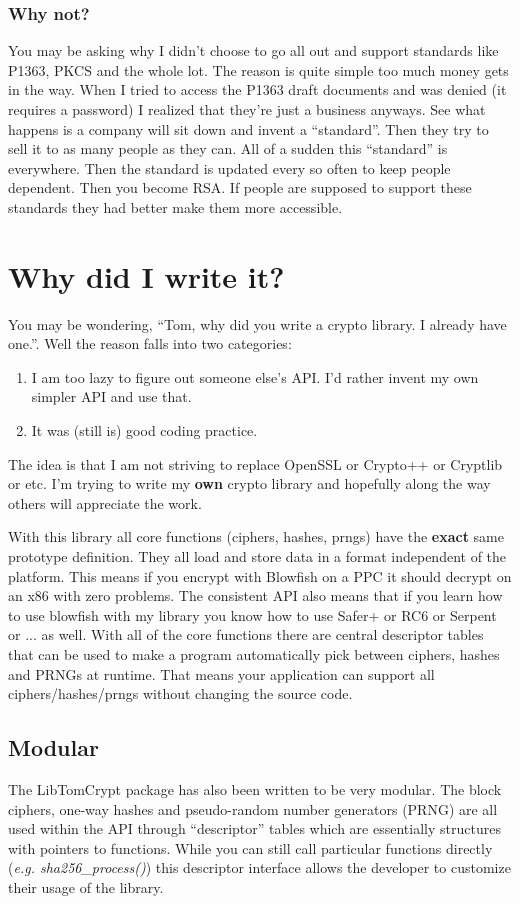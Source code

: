 \documentclass[b5paper]{book}
\begin{document}
\subsubsection{Why not?}
You may be asking why I didn't choose to go all out and support standards like P1363, PKCS and the whole lot.  The reason
is quite simple too much money gets in the way.  When I tried to access the P1363 draft documents and was denied (it 
requires a password) I realized that they're just a business anyways.  See what happens is a company will sit down and
invent a ``standard''.  Then they try to sell it to as many people as they can.  All of a sudden this ``standard'' is 
everywhere.  Then the standard is updated every so often to keep people dependent.  Then you become RSA.  If people are 
supposed to support these standards they had better make them more accessible.

\section{Why did I write it?}
You may be wondering, ``Tom, why did you write a crypto library.  I already have one.''.  Well the reason falls into
two categories:
\begin{enumerate}
    \item I am too lazy to figure out someone else's API.  I'd rather invent my own simpler API and use that.
    \item It was (still is) good coding practice.
\end{enumerate}

The idea is that I am not striving to replace OpenSSL or Crypto++ or Cryptlib or etc.  I'm trying to write my 
{\bf own} crypto library and hopefully along the way others will appreciate the work.

With this library all core functions (ciphers, hashes, prngs) have the {\bf exact} same prototype definition.  They all load
and store data in a format independent of the platform.  This means if you encrypt with Blowfish on a PPC it should decrypt
on an x86 with zero problems.  The consistent API also means that if you learn how to use blowfish with my library you 
know how to use Safer+ or RC6 or Serpent or ... as well.  With all of the core functions there are central descriptor tables 
that can be used to make a program automatically pick between ciphers, hashes and PRNGs at runtime.  That means your 
application can support all ciphers/hashes/prngs without changing the source code.

\subsection{Modular}
The LibTomCrypt package has also been written to be very modular.  The block ciphers, one-way hashes and
pseudo-random number generators (PRNG) are all used within the API through ``descriptor'' tables which 
are essentially structures with pointers to functions.  While you can still call particular functions
directly (\textit{e.g. sha256\_process()}) this descriptor interface allows the developer to customize their
usage of the library.
\end{document}
